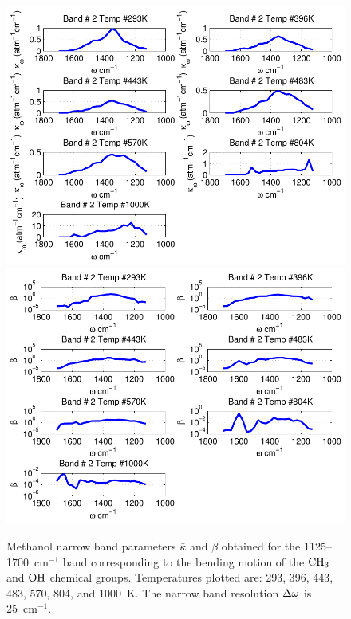 \begin{figure}[p]
\begin{center}
\includegraphics[width=5.0in]{Figures/Methanol_Kappa_Band2_MALKMUS.pdf}
\includegraphics[width=5.0in]{Figures/Methanol_Beta_Band2_MALKMUS.pdf}
\end{center}
\caption{Methanol narrow band parameters $\bar{\kappa}$ and $\beta$ obtained for the 1125--1700~cm$^{-1}$ band corresponding to the bending motion of the $\rm CH_3$ and $\rm OH$ chemical groups. Temperatures plotted are: 293, 396, 443, 483, 570, 804, and 1000~K. The narrow band resolution $\Delta \omega$ is 25~cm$^{-1}$.\label{fig:methanol_kappa_beta2}}
\end{figure}

